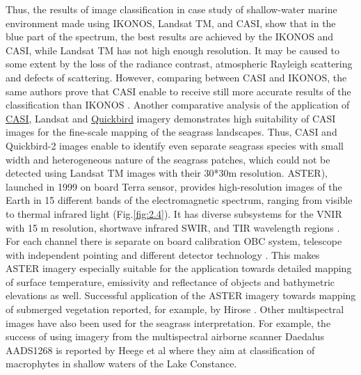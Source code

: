\documentclass[11pt]{article}
\begin{document}
Thus, the results of image classification in case study of shallow-water marine environment \cite{Mumby02}\label{Mumby02}
made using IKONOS, \ac{Landsat TM}, and \ac{CASI}, show that in the blue part of the
spectrum, the best results are achieved by the IKONOS and \ac{CASI}, while \ac{Landsat TM} has not high
enough resolution. 
It may be caused to some extent by the loss of the radiance contrast, atmospheric
Rayleigh scattering and defects of scattering. However, comparing between CASI and IKONOS, the
same authors prove that \ac{CASI} enable to receive still more accurate results of the classification
than IKONOS \cite{Mumby02}\label{Mumby02}.
Another comparative analysis of the application of \href{http://www.itres.com/products/imagers/casi550}{CASI}, Landsat and \href{http://www.digitalglobe.com/index.php/85/QuickBird}{Quickbird} imagery \cite{Phinn08}\label{Phinn08}
 demonstrates high suitability of \ac{CASI} images for the fine-scale mapping of the seagrass
landscapes. Thus, \ac{CASI} and Quickbird-2 images enable to identify even separate seagrass species
with small width and heterogeneous nature of the seagrass patches, which could not be detected using
Landsat TM images with their 30*30m resolution.
\ac{ASTER}), launched in
1999 on board Terra sensor, provides high-resolution images of the Earth in 15 different bands of the
electromagnetic spectrum, ranging from visible to thermal infrared light  (Fig.\ref{fig:2.4}). It has diverse
subsystems for the \ac{VNIR} with 15 m resolution, shortwave infrared \ac{SWIR}, and
\ac{TIR} wavelength regions \cite{Kalinowski04}\label{Kalinowski04}. For each channel there is separate
on board calibration \ac{OBC} system, telescope with independent pointing and different detector technology \cite{Arai05}\label{Arai05}. 
This makes \ac{ASTER} imagery especially suitable for the application towards detailed
mapping of surface temperature, emissivity and reflectance of objects and bathymetric elevations as
well. Successful application of the \ac{ASTER} imagery towards mapping of submerged vegetation
reported, for example, by Hirose \cite{Hirose04}\label{Hirose04}. 
Other multispectral images have also been used for the
seagrass interpretation. For example, the success of using imagery from the multispectral airborne
scanner Daedalus AADS1268 is reported by Heege et al \cite{Heege03}\label{Heege03} where they aim at classification of
macrophytes in shallow waters of the Lake Constance. 
\end{document}
